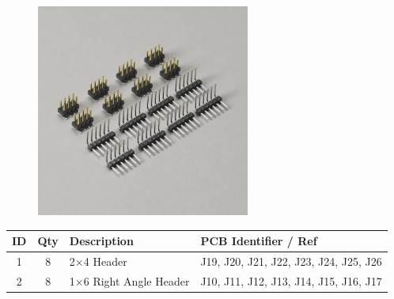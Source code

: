\documentclass[12pt, a4paper]{article}
\newcommand{\drawtext}[2]{
    \node[black] at (#1) {{#2}};
}
\begin{document}
\begin{figure}[H]
    \centering
    \hspace{2mm}
    \includegraphics[width=7cm]{images/20_02_breadboard_headers_sideview.jpg}
\end{figure}

\begin{center}
    \small
    \setlength\extrarowheight{4pt}
    \begin{tabularx}{\textwidth}{|c|c|X|l|}
        \hline \rowcolor{lightgray} ID & Qty & Description & PCB Identifier / Ref\\
        \hline 1 & 8 & 2×4 Header & J19, J20, J21, J22, J23, J24, J25, J26\\
        \hline 2 & 8 & 1×6 Right Angle Header & J10, J11, J12, J13, J14, J15, J16, J17\\
        \hline
    \end{tabularx}
\end{center}
\end{document}
